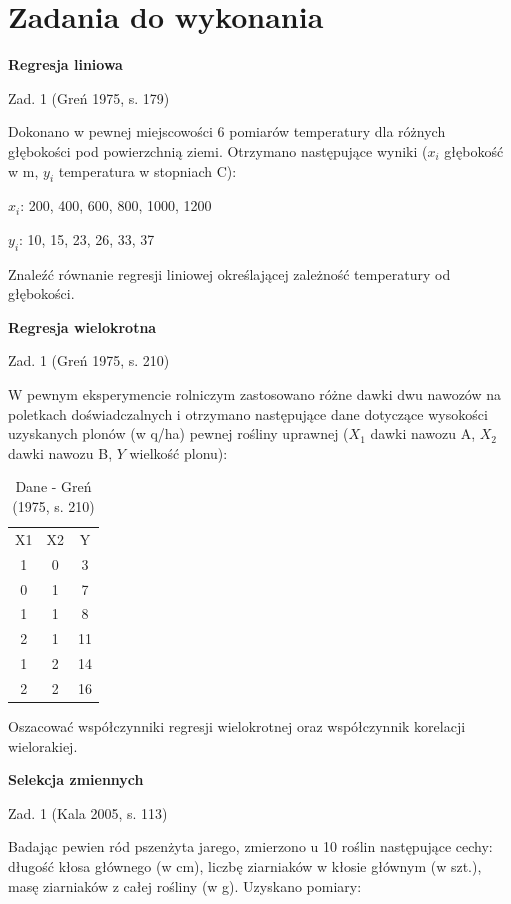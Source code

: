 \documentclass[12pt,B5paper,]{book}
\begin{document}
\newpage

\section{Zadania do wykonania}\label{zadania-do-wykonania-6}

\textbf{Regresja liniowa}

Zad. 1 (Greń 1975, s. 179)

Dokonano w pewnej miejscowości 6 pomiarów temperatury dla różnych
głębokości pod powierzchnią ziemi. Otrzymano następujące wyniki (\(x_i\)
głębokość w m, \(y_i\) temperatura w stopniach C):

\(x_i\): 200, 400, 600, 800, 1000, 1200

\(y_i\): 10, 15, 23, 26, 33, 37

Znaleźć równanie regresji liniowej określającej zależność temperatury od
głębokości.

\vspace{0.8cm} \textbf{Regresja wielokrotna}

Zad. 1 (Greń 1975, s. 210)

W pewnym eksperymencie rolniczym zastosowano różne dawki dwu nawozów na
poletkach doświadczalnych i otrzymano następujące dane dotyczące
wysokości uzyskanych plonów (w q/ha) pewnej rośliny uprawnej (\(X_1\)
dawki nawozu A, \(X_2\) dawki nawozu B, \(Y\) wielkość plonu):

\begin{table}[H]
\centering
\caption{Dane - Greń (1975, s. 210)}
\label{gren210}
\begin{tabular}{ccc}
X1 & X2 & Y  \\
1  & 0  & 3  \\
0  & 1  & 7  \\
1  & 1  & 8  \\
2  & 1  & 11 \\
1  & 2  & 14 \\
2  & 2  & 16
\end{tabular}
\end{table}

Oszacować współczynniki regresji wielokrotnej oraz współczynnik
korelacji wielorakiej.

\vspace{0.8cm} \textbf{Selekcja zmiennych}

Zad. 1 (Kala 2005, s. 113)

Badając pewien ród pszenżyta jarego, zmierzono u 10 roślin następujące
cechy: długość kłosa głównego (w cm), liczbę ziarniaków w kłosie głównym
(w szt.), masę ziarniaków z całej rośliny (w g). Uzyskano pomiary:
\end{document}

